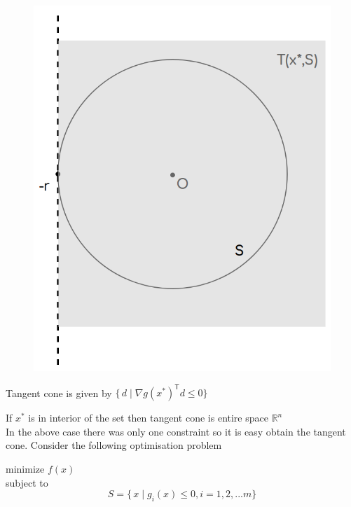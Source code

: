 \documentclass[twoside]{article}
\begin{document}
\begin{figure}[h]
\center
\includegraphics[scale=0.35]{images/pic4.png}
\end{figure}

Tangent cone is given by 
$\{\,d\mid \nabla g(x^*)^\mathsf{T}d\leq 0 \}$

If $x^{*}$ is in interior of the set then tangent cone is entire space $\mathbb{R}^n$\\

In the above case there was only one constraint so it is easy obtain the tangent cone. Consider the following optimisation problem 
\begin{center}
	minimize $f(x)$\\
	subject to $$S = \{\,x\mid g_{i}(x)\leq 0 , i = 1,2,...m\}$$
\end{center}
\end{document}
